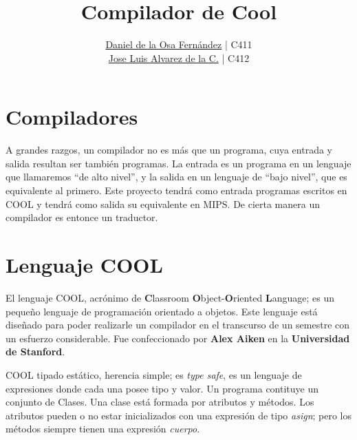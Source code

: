 \documentclass[]{article}
\title{Compilador de Cool}
\author{
	\href{mailto:d.osa@estudiantes.matcom.uh.cu}{Daniel de la Osa Fernández} | C411  \\
	\href{mailto:j.alvarez@estudiantes.matcom.uh.cu}{Jose Luis Alvarez de la C.} | C412  
	}
\begin{document}
\twocolumn[
	\maketitle

]



\section{Compiladores}\label{sec:com}
	 A grandes razgos, un compilador no es más que un programa, cuya entrada y salida resultan ser también programas. La entrada es un programa en un lenguaje que llamaremos “de alto nivel”, y la salida en un lenguaje de “bajo nivel”, que es equivalente al primero. Este proyecto tendrá como entrada programas escritos en COOL y tendrá como salida su equivalente en MIPS. De cierta manera un compilador es entonce un traductor. 
\section{Lenguaje COOL}\label{sec:cool}
	El lenguaje COOL, acrónimo de \textbf{C}lassroom \textbf{O}bject-\textbf{O}riented \textbf{L}anguage; es un pequeño lenguaje de programación orientado a objetos. Este lenguaje está diseñado para poder realizarle un compilador en el transcurso de un semestre con un esfuerzo considerable. Fue confeccionado por \textbf{Alex Aiken} \cite{aiken} en la \textbf{Universidad de Stanford}.

	COOL tipado estático, herencia simple; es \textit{type safe}, es un lenguaje de expresiones donde cada una posee tipo y valor. Un programa contituye un conjunto de Clases. Una clase está formada por atributos y métodos. Los atributos pueden o no estar inicializados con una expresión de tipo \textit{asign}; pero los métodos siempre tienen una expresión \textit{cuerpo}.
\end{document}

